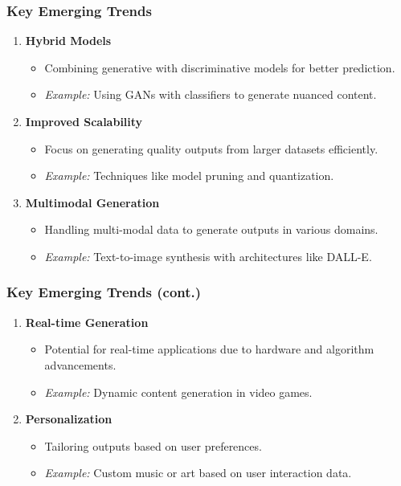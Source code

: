 \documentclass[aspectratio=169]{beamer}
\begin{document}
\begin{frame}[fragile]
    \frametitle{Key Emerging Trends}
    \begin{enumerate}
        \item \textbf{Hybrid Models}
            \begin{itemize}
                \item Combining generative with discriminative models for better prediction.
                \item \textit{Example:} Using GANs with classifiers to generate nuanced content.
            \end{itemize}
        \item \textbf{Improved Scalability}
            \begin{itemize}
                \item Focus on generating quality outputs from larger datasets efficiently.
                \item \textit{Example:} Techniques like model pruning and quantization.
            \end{itemize}
        \item \textbf{Multimodal Generation}
            \begin{itemize}
                \item Handling multi-modal data to generate outputs in various domains.
                \item \textit{Example:} Text-to-image synthesis with architectures like DALL-E.
            \end{itemize}
    \end{enumerate}
\end{frame}

\begin{frame}[fragile]
    \frametitle{Key Emerging Trends (cont.)}
    \begin{enumerate}[resume]
        \item \textbf{Real-time Generation}
            \begin{itemize}
                \item Potential for real-time applications due to hardware and algorithm advancements.
                \item \textit{Example:} Dynamic content generation in video games.
            \end{itemize}
        \item \textbf{Personalization}
            \begin{itemize}
                \item Tailoring outputs based on user preferences.
                \item \textit{Example:} Custom music or art based on user interaction data.
            \end{itemize}
    \end{enumerate}
\end{frame}
\end{document}
